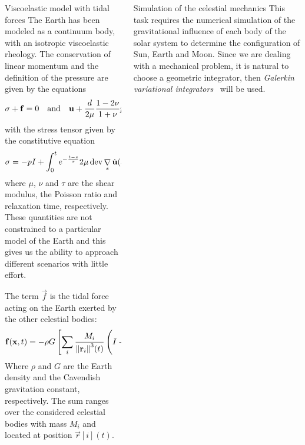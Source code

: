 \documentclass[final]{beamer}
\newlength{\onecolwid}
\DeclareMathOperator{\grad}{\nabla}
\let\div\relax
\DeclareMathOperator{\div}{div}
\DeclareMathOperator{\dev}{dev}
\begin{document}
\begin{frame}[t]
\begin{columns}[t]
\begin{column}{\onecolwid}
\begin{block}{Viscoelastic model with tidal forces}
The Earth has been modeled as a continuum body, with an isotropic viscoelastic
rheology. The conservation of linear momentum and the definition of the
pressure are given by the equations
\[
  \div\tensor{\sigma} + \vec{f} = 0
  \quad\text{and}\quad
  \div\vec{u} + \frac{d}{2\mu} \frac{1-2\nu}{1+\nu} p = 0;
\]
with the stress tensor given by the constitutive equation
\[
  \tensor{\sigma} = -p \tensor{I} +
  \int_0^t e^{-\frac{t-s}{\tau}} 2\mu \dev\grad_s\dot{\vec{u}}(s) \, ds,
\]
where $\mu$, $\nu$ and $\tau$ are the shear modulus, the Poisson ratio and
relaxation time, respectively. These quantities are not constrained to a
particular model of the Earth and this gives us the ability to approach
different scenarios with little effort.

The term $\vec{f}$ is the tidal force acting on the Earth exerted by the other
celestial bodies:
\[
  \vec{f}(\vec{x}, t)= -\rho G \left[
    \sum_i \frac{M_i}{\norm{\vec{r}[i]}[][3](t)} \left(
      \tensor{I} -
      3 \frac{\vec{r}[i](t) \otimes \vec{r}[i](t)}{\norm{\vec{r}[i](t)}[][2]}
    \right)
  \right] \vec{x}.
\]
Where $\rho$ and $G$ are the Earth density and the Cavendish gravitation
constant, respectively. The sum ranges over the considered celestial bodies
with mass $M_i$ and located at position $\vec{r}[i](t)$.
\end{block}

\end{column} %


\begin{column}{\onecolwid} %

\begin{block}{Simulation of the celestial mechanics}
This task requires the numerical simulation of the gravitational influence of
each body of the solar system to determine the configuration of Sun, Earth and
Moon.  Since we are dealing with a mechanical problem, it is natural to choose
a geometric integrator, then \emph{Galerkin variational
integrators}~\cite{Miglio-Parolini:variational-integrators} will be used.


\end{block}
\end{column}
\end{columns}
\end{frame}
\end{document}
